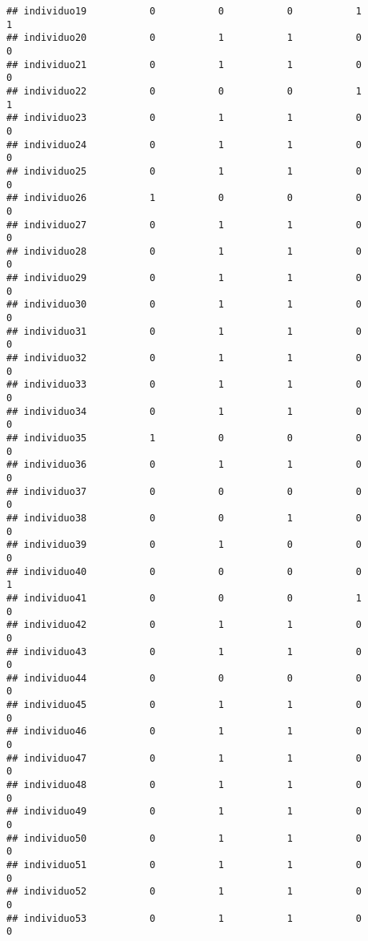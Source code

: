 \documentclass[
]{article}
\begin{document}
\begin{verbatim}
## individuo19           0           0           0           1           1
## individuo20           0           1           1           0           0
## individuo21           0           1           1           0           0
## individuo22           0           0           0           1           1
## individuo23           0           1           1           0           0
## individuo24           0           1           1           0           0
## individuo25           0           1           1           0           0
## individuo26           1           0           0           0           0
## individuo27           0           1           1           0           0
## individuo28           0           1           1           0           0
## individuo29           0           1           1           0           0
## individuo30           0           1           1           0           0
## individuo31           0           1           1           0           0
## individuo32           0           1           1           0           0
## individuo33           0           1           1           0           0
## individuo34           0           1           1           0           0
## individuo35           1           0           0           0           0
## individuo36           0           1           1           0           0
## individuo37           0           0           0           0           0
## individuo38           0           0           1           0           0
## individuo39           0           1           0           0           0
## individuo40           0           0           0           0           1
## individuo41           0           0           0           1           0
## individuo42           0           1           1           0           0
## individuo43           0           1           1           0           0
## individuo44           0           0           0           0           0
## individuo45           0           1           1           0           0
## individuo46           0           1           1           0           0
## individuo47           0           1           1           0           0
## individuo48           0           1           1           0           0
## individuo49           0           1           1           0           0
## individuo50           0           1           1           0           0
## individuo51           0           1           1           0           0
## individuo52           0           1           1           0           0
## individuo53           0           1           1           0           0

\end{verbatim}
\end{document}

